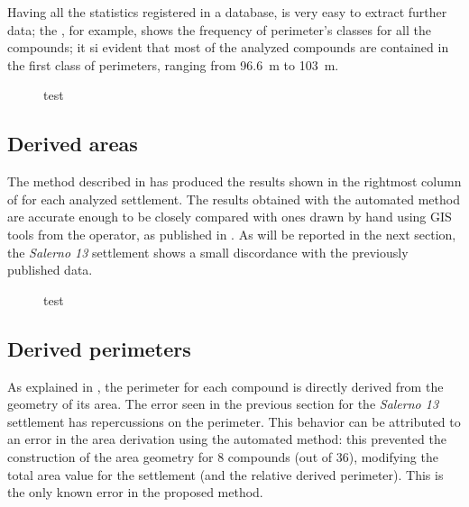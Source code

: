             Having all the statistics registered in a database, is very easy to extract further data; the , for example, shows the frequency of perimeter's classes for all the compounds; it si evident that most of the analyzed compounds are contained in the first class of perimeters, ranging from \SI{96.6}{\meter} to \SI{103}{\meter}.

            \begin{figure}[H]
                \centering
                \begin{tikzpicture}
                    
                \end{tikzpicture}
                \caption[test]{test}
                \label{fig:graph-perim-class}
            \end{figure}

        \subsection{Derived areas}

            The method described in  has produced the results shown in the rightmost column of  for each analyzed settlement. The results obtained with the automated method are accurate enough to be closely compared with ones drawn by hand using GIS tools from the operator, as published in \cite{laterza}.
            As will be reported in the next section, the \emph{Salerno 13} settlement shows a small discordance with the previously published data.

            \begin{figure}[H]
                \centering
                \begin{tikzpicture}
                    
                \end{tikzpicture}
                \caption[test]{test}
                \label{fig:graph-area}
            \end{figure}

        \subsection{Derived perimeters}
            
            As explained in , the perimeter for each compound is directly derived from the geometry of its area. The error seen in the previous section for the \emph{Salerno 13} settlement has repercussions on the perimeter. This behavior can be attributed to an error in the area derivation using the automated method: this prevented the construction of the area geometry for 8 compounds (out of 36), modifying the total area value for the settlement (and the relative derived perimeter). This is the only known error in the proposed method.

